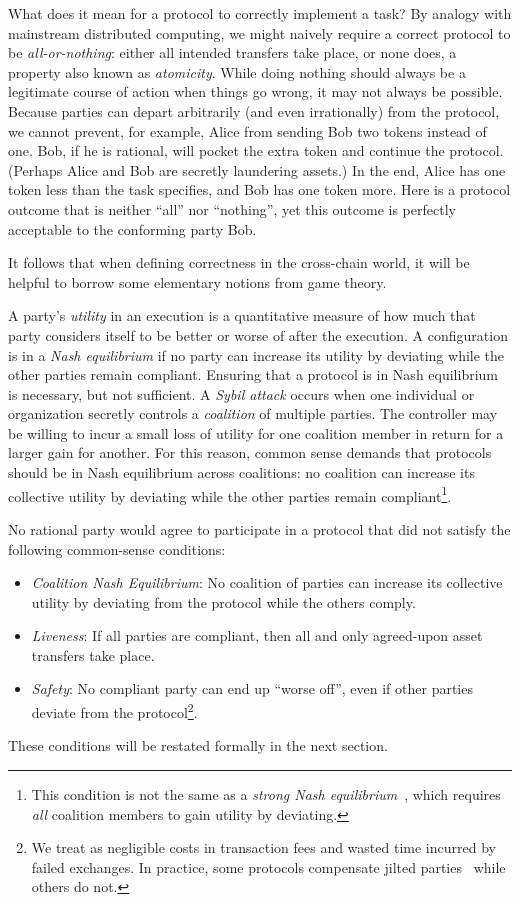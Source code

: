 What does it mean for a protocol to correctly implement a task?
By analogy with mainstream distributed computing,
we might naively require a correct protocol to be \emph{all-or-nothing}:
either all intended transfers take place, or none does,
a property also known as \emph{atomicity}.
While doing nothing should always be a legitimate course of action when things go wrong,
it may not always be possible.
Because parties can depart arbitrarily (and even irrationally) from the protocol,
we cannot prevent, for example, 
Alice from sending Bob two tokens instead of one.
Bob, if he is rational, will pocket the extra token and continue the protocol.
(Perhaps Alice and Bob are secretly laundering assets.)
In the end, Alice has one token less than the task specifies,
and Bob has one token more.
Here is a protocol outcome that is neither ``all'' nor ``nothing'',
yet this outcome is perfectly acceptable to the conforming party Bob.

It follows that when defining correctness in the cross-chain world,
it will be helpful to borrow
some elementary notions from game theory.

A party's \emph{utility} in an execution is a quantitative
measure of how much that party considers itself to be better
or worse of after the execution.
A configuration
is in a \emph{Nash equilibrium} if no party can increase its
utility by deviating while the other parties remain compliant.
Ensuring that a protocol is in Nash equilibrium is
necessary, but not sufficient.
A \emph{Sybil attack} occurs when one individual or organization
secretly controls a \emph{coalition} of multiple parties.
The controller may be willing to incur a small loss of utility
for one coalition member in return for a larger gain for another.
For this reason,
common sense demands that
protocols should be in Nash equilibrium across coalitions:
no coalition can increase its collective utility by deviating
while the other parties remain compliant\footnote{
This condition is not the same as a \emph{strong Nash equilibrium}~\cite{StrongNashEquilibrium},
which requires \emph{all} coalition members to gain utility by deviating.}.

No rational party would agree to participate in a protocol
that did not satisfy the following common-sense conditions:
\begin{itemize}
\item
  \emph{Coalition Nash Equilibrium}:
  No coalition of parties can increase its collective utility by deviating from the protocol
  while the others comply.

\item
  \emph{Liveness}:
  If all parties are compliant,
  then all and only agreed-upon asset transfers take place.
  
\item
  \emph{Safety}: No compliant party can end up ``worse off'',
  even if other parties deviate from the protocol\footnote{
  We treat as negligible costs in transaction fees and wasted time incurred by failed exchanges.
  In practice,
  some protocols compensate jilted parties~\cite{XueH2021} while others do not.}.
\end{itemize}
These conditions will be restated formally in the next section.

